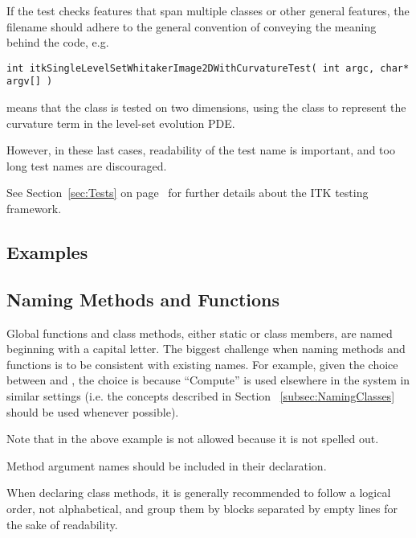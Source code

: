 If the test checks features that span multiple classes or other general
features, the filename should adhere to the general convention of conveying the
meaning behind the code, e.g.
\small
\begin{verbatim}
int itkSingleLevelSetWhitakerImage2DWithCurvatureTest( int argc, char* argv[] )
\end{verbatim}
\normalsize

means that the  class is tested on two
dimensions, using the  class to
represent the curvature term in the level-set evolution PDE.

However, in these last cases, readability of the test name is important, and too
long test names are discouraged.

See Section~\ref{sec:Tests} on page~\pageref{sec:Tests} for further details
about the ITK testing framework.


\subsection{Examples}
\label{subsec:Examples}


\subsection{Naming Methods and Functions}
\label{subsec:NamingMethodsAndFunctions}

Global functions and class methods, either static or class members, are named
beginning with a capital letter. The biggest challenge when naming methods and
functions is to be consistent with existing names. For example, given the choice
between  and , the
choice is   because ``Compute'' is used elsewhere in
the system in similar settings (i.e. the concepts described in Section
~\ref{subsec:NamingClasses} should be used whenever possible).

Note that in the above example  is not allowed because
it is not spelled out.

Method argument names should be included in their declaration.

When declaring class methods, it is generally recommended to follow a logical
order, not alphabetical, and group them by blocks separated by empty
lines for the sake of readability.

